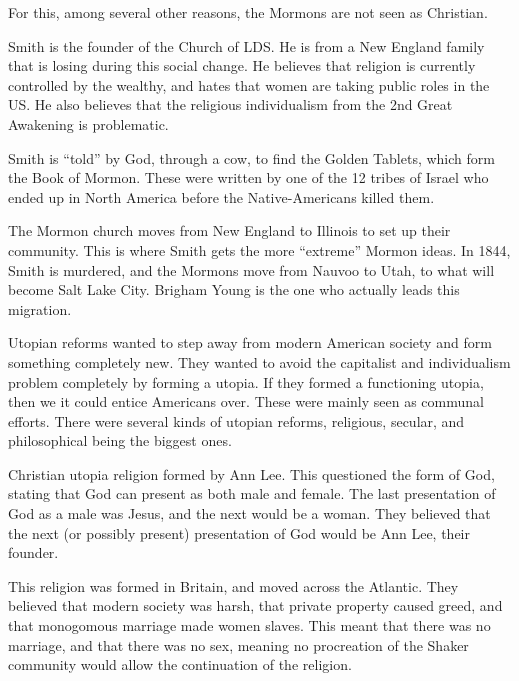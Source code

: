 \begin{description}
  For this, among several other reasons, the Mormons are not seen as Christian.

  \begin{description}[noitemsep]
  \item[Joseph Smith] Smith is the founder of the Church of LDS.\@
    He is from a New England family that is losing during this social change.
    He believes that religion is currently controlled by the wealthy, and hates that women are taking public roles in the US.\@
    He also believes that the religious individualism from the 2nd Great Awakening is problematic.

  \item[Book of Mormon] Smith is ``told'' by God, through a cow, to find the Golden Tablets, which form the Book of Mormon.
    These were written by one of the 12 tribes of Israel who ended up in North America before the Native-Americans killed them.

  \item[Nauvoo, Illinois] The Mormon church moves from New England to Illinois to set up their community.
    This is where Smith gets the more ``extreme'' Mormon ideas.
    In 1844, Smith is murdered, and the Mormons move from Nauvoo to Utah, to what will become Salt Lake City.
    Brigham Young is the one who actually leads this migration.
  \end{description}

\item[Utopian Reform] Utopian reforms wanted to step away from modern American society and form something completely new.
  They wanted to avoid the capitalist and individualism problem completely by forming a utopia.
  If they formed a functioning utopia, then we it could entice Americans over.
  These were mainly seen as communal efforts.
  There were several kinds of utopian reforms, religious, secular, and philosophical being the biggest ones.
  \begin{description}[noitemsep]
  \item[Shakers] Christian utopia religion formed by Ann Lee.
    This questioned the form of God, stating that God can present as both male and female.
    The last presentation of God as a male was Jesus, and the next would be a woman.
    They believed that the next (or possibly present) presentation of God would be Ann Lee, their founder.

    This religion was formed in Britain, and moved across the Atlantic.
    They believed that modern society was harsh, that private property caused greed, and that monogomous marriage made women slaves.
    This meant that there was no marriage, and that there was no sex, meaning no procreation of the Shaker community would allow the continuation of the religion.


\end{description}
\end{description}
